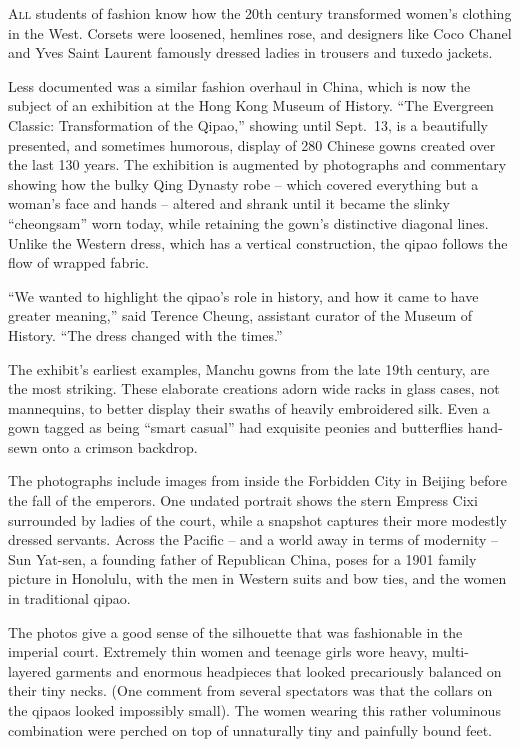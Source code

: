 ﻿\documentclass[12pt]{article}
\begin{document}
\lettrine{A}{ll} students of fashion know how the 20th century transformed
women's clothing in the West. Corsets were loosened, hemlines rose, and designers like Coco Chanel
and Yves Saint Laurent famously dressed ladies in trousers and tuxedo jackets.

Less documented was a similar fashion overhaul in China, which is now the subject of an exhibition
at the Hong Kong Museum of History. ``The Evergreen Classic: Transformation of the Qipao,'' showing
until Sept.~13, is a beautifully presented, and sometimes humorous, display of 280 Chinese gowns
created over the last 130 years. The exhibition is augmented by photographs and commentary showing
how the bulky Qing Dynasty robe -- which covered everything but a woman's face and hands -- altered
and shrank until it became the slinky ``cheongsam'' worn today, while retaining the gown's
distinctive diagonal lines. Unlike the Western dress, which has a vertical construction, the qipao
follows the flow of wrapped fabric.

``We wanted to highlight the qipao's role in history, and how it came to have greater meaning,''
said Terence Cheung, assistant curator of the Museum of History. ``The dress changed with the
times.''

The exhibit's earliest examples, Manchu gowns from the late 19th century, are the most striking.
These elaborate creations adorn wide racks in glass cases, not mannequins, to better display their
swaths of heavily embroidered silk. Even a gown tagged as being ``smart casual'' had exquisite
peonies and butterflies hand-sewn onto a crimson backdrop.

The photographs include images from inside the Forbidden City in Beijing before the fall of the
emperors. One undated portrait shows the stern Empress Cixi surrounded by ladies of the court, while
a snapshot captures their more modestly dressed servants. Across the Pacific -- and a world away in
terms of modernity -- Sun Yat-sen, a founding father of Republican China, poses for a 1901 family
picture in Honolulu, with the men in Western suits and bow ties, and the women in traditional qipao.

The photos give a good sense of the silhouette that was fashionable in the imperial court. Extremely
thin women and teenage girls wore heavy, multi-layered garments and enormous headpieces that looked
precariously balanced on their tiny necks. (One comment from several spectators was that the collars
on the qipaos looked impossibly small). The women wearing this rather voluminous combination were
perched on top of unnaturally tiny and painfully bound feet.
\end{document}
